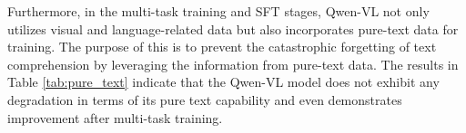 \documentclass{article}
\begin{document}
Furthermore, in the multi-task training and SFT stages, Qwen-VL not only utilizes visual and language-related data but also incorporates pure-text data for training. The purpose of this is to prevent the catastrophic forgetting of text comprehension by leveraging the information from pure-text data. The results in Table \ref{tab:pure_text} indicate that the Qwen-VL model does not exhibit any degradation in terms of its pure text capability and even demonstrates improvement after multi-task training.
\end{document}
